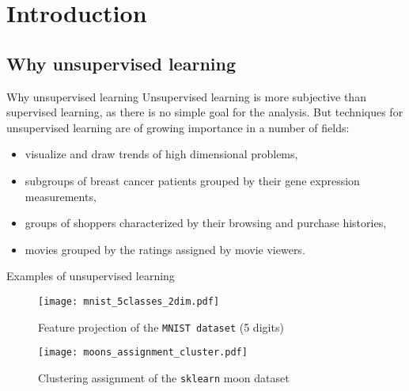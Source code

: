
\section{Introduction}
\label{cap:introduction}

\subsection{Why unsupervised learning}
\begin{frame}{Why unsupervised learning}
    Unsupervised learning is more subjective than supervised learning, as there is no simple goal for the analysis. But techniques for unsupervised learning are of growing importance in a number of fields:
    \begin{itemize}
        \pause
        \item visualize and draw trends of high dimensional problems,
        \pause
        \item subgroups of breast cancer patients grouped by their gene expression measurements,
        \pause
        \item groups of shoppers characterized by their browsing and purchase histories,
        \item movies grouped by the ratings assigned by movie viewers.
    \end{itemize}
\end{frame}

\begin{frame}{Examples of unsupervised learning}
    \begin{minipage}{.48\textwidth}
        \begin{figure}
            \texttt{[image: mnist\_5classes\_2dim.pdf]}
            \caption{Feature projection of the \texttt{MNIST dataset} (5 digits)}
        \end{figure}
    \end{minipage}
    \begin{minipage}{.48\textwidth}
        \begin{figure}
            \texttt{[image: moons\_assignment\_cluster.pdf]}
            \caption{Clustering assignment of the \texttt{sklearn} moon dataset}
        \end{figure}
    \end{minipage}
\end{frame}
